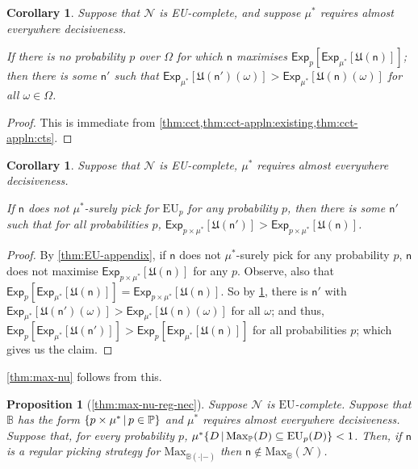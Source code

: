 \documentclass[a4paper]{article}
\newtheorem{proposition}[theorem]{Proposition}
\newtheorem{corollary}[theorem]{Corollary}
\renewcommand\P{\mathbb{P}} %
\newcommand\Exp{\mathsf{Exp}}
\newcommand\EU{\mathrm{EU}}
\newcommand\U{\mathfrak{U}} %
\newcommand\Maximality{\mathrm{Max}}
\newcommand{\n}{\mathsf{n}}
\newcommand\Nu{\mathcal{N}}
\newcommand{\IB}{\mathbb{B}}
\newcommand{\IP}{\P}
\newcommand\SetDelimiter[1][]{
	\nonscript\,#1\vert \allowbreak \nonscript\,\mathopen{}}
\providecommand\given{\SetDelimiter}
\newenvironment{CCM rewritten}
{\begingroup\color{blue}} %
{\endgroup}              %
\begin{document}
\begin{corollary}\label{thm:cct-applns:corr}
	Suppose that $\Nu$ is EU-complete, and suppose $\mu^*$ requires almost everywhere decisiveness. 
	
	
	If there is no probability $p$ over $\Omega$ for which $\n$ maximises $\Exp_{p}[\Exp_{\mu^*}[\U(\n)]]$; then there is some $\n'$ such that $\Exp_{\mu^*}[\U(\n')(\omega)]>\Exp_{\mu^*}[\U(\n)(\omega)]$ for all $\omega\in\Omega$. 
\end{corollary}
\begin{proof}
	This is immediate from \cref{thm:cct,thm:cct-appln:existing,thm:cct-appln:cts}.
\end{proof}
\begin{corollary}\label{cor:max-dom}
		Suppose that $\Nu$ is EU-complete, $\mu^*$ requires almost everywhere decisiveness. %
		
	If $\n$ does not $\mu^*$-surely pick for $\EU_p$ for any probability $p$, then there is some $\n'$ such that for all probabilities $p$, $\Exp_{p\times\mu^*}[\U(\n')]>\Exp_{p\times\mu^*}[\U(\n)]$. 
\end{corollary}
\begin{proof}
	By \cref{thm:EU-appendix}, if $\n$ does not $\mu^*$-surely pick for any probability $p$, $\n$ does not maximise $\Exp_{p\times\mu^*}[\U(\n)]$ for any $p$. Observe, also that $\Exp_p[\Exp_{\mu^*}[\U(\n)]]=\Exp_{p\times\mu^*}[\U(\n)]$. So by \cref{thm:cct-applns:corr}, there is $\n'$ with  $\Exp_{\mu^*}[\U(\n')(\omega)]>\Exp_{\mu^*}[\U(\n)(\omega)]$ for all $\omega$; and thus, $\Exp_{p}[\Exp_{\mu^*}[\U(\n')]]>\Exp_p[\Exp_{\mu^*}[\U(\n)]]$ for all probabilities $p$; which gives us the claim.
\end{proof}
\cref{thm:max-nu} follows from this.%


\begin{proposition}[\cref{thm:max-nu-reg-nec}]
	Suppose $\Nu$ is $\EU$-complete. 
	Suppose that $\IB$ has the form $\{p\times \mu^*\given p\in \IP\}$ and $\mu^*$ requires almost everywhere decisiveness. Suppose that, for every probability $p$, $\mu^*\{D\given \Maximality_\IP(D)\subseteq\EU_p(D)\}< 1$. Then, if $\n$ is a regular picking strategy for $\Maximality_{\IB(\cdot|-)}$ then $\n\notin \Maximality_\IB(\Nu)$.
\end{proposition}
\end{document}
